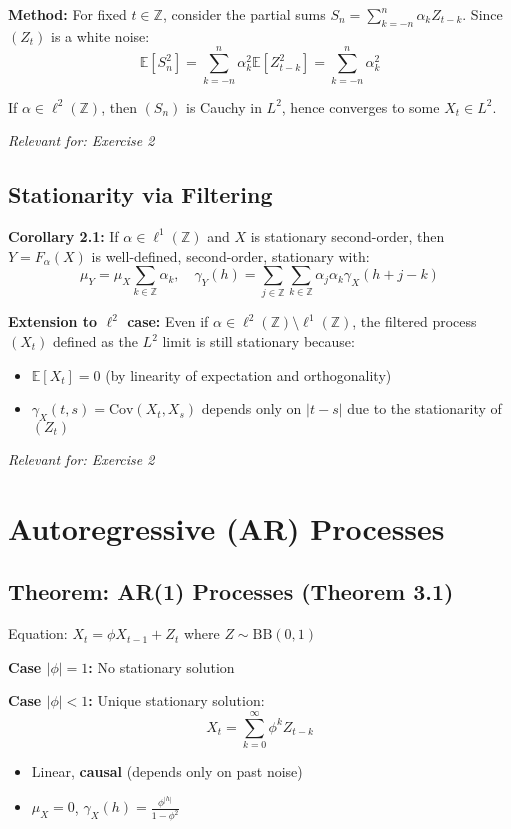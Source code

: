 \documentclass[a4paper, 12pt]{article}
\begin{document}
\textbf{Method:} For fixed $t \in \mathbb{Z}$, consider the partial sums $S_n = \sum_{k=-n}^n \alpha_k Z_{t-k}$. Since $(Z_t)$ is a white noise:
\[
\mathbb{E}[S_n^2] = \sum_{k=-n}^n \alpha_k^2 \mathbb{E}[Z_{t-k}^2] = \sum_{k=-n}^n \alpha_k^2
\]

If $\alpha \in \ell^2(\mathbb{Z})$, then $(S_n)$ is Cauchy in $L^2$, hence converges to some $X_t \in L^2$.

\textit{Relevant for: Exercise 2}

\subsection{Stationarity via Filtering}
\textbf{Corollary 2.1:} If $\alpha \in \ell^1(\mathbb{Z})$ and $X$ is stationary second-order, then $Y = F_\alpha(X)$ is well-defined, second-order, stationary with:
\[
\mu_Y = \mu_X \sum_{k \in \mathbb{Z}} \alpha_k, \quad \gamma_Y(h) = \sum_{j \in \mathbb{Z}} \sum_{k \in \mathbb{Z}} \alpha_j\alpha_k\gamma_X(h+j-k)
\]

\textbf{Extension to $\ell^2$ case:} Even if $\alpha \in \ell^2(\mathbb{Z}) \setminus \ell^1(\mathbb{Z})$, the filtered process $(X_t)$ defined as the $L^2$ limit is still stationary because:
\begin{itemize}
\item $\mathbb{E}[X_t] = 0$ (by linearity of expectation and orthogonality)
\item $\gamma_X(t,s) = \text{Cov}(X_t, X_s)$ depends only on $|t-s|$ due to the stationarity of $(Z_t)$
\end{itemize}

\textit{Relevant for: Exercise 2}

\section{Autoregressive (AR) Processes}

\subsection{Theorem: AR(1) Processes (Theorem 3.1)}
Equation: $X_t = \phi X_{t-1} + Z_t$ where $Z \sim \text{BB}(0,1)$

\textbf{Case $|\phi| = 1$:} No stationary solution

\textbf{Case $|\phi| < 1$:} Unique stationary solution:
\[
X_t = \sum_{k=0}^\infty \phi^k Z_{t-k}
\]
\begin{itemize}
\item Linear, \textbf{causal} (depends only on past noise)
\item $\mu_X = 0$, $\gamma_X(h) = \frac{\phi^{|h|}}{1-\phi^2}$
\end{itemize}
\end{document}
